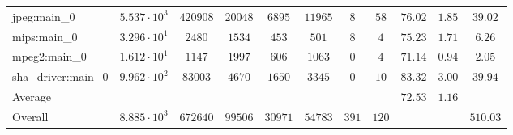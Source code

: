 \begin{tabular}{|l|c|c|c|c|c|c|c|c|c|c|}
jpeg:main\_0            & $ 5.537 \cdot 10^{3} $ & $ 420908 $ & $ 20048 $ & $ 6895  $ & $ 11965 $ & $ 8   $ & $ 58  $ & $ 76.02       $ & $ 1.85    $ & $ 39.02   $ \\
mips:main\_0            & $ 3.296 \cdot 10^{1} $ & $ 2480   $ & $ 1534  $ & $ 453   $ & $ 501   $ & $ 8   $ & $ 4   $ & $ 75.23       $ & $ 1.71    $ & $ 6.26    $ \\
mpeg2:main\_0           & $ 1.612 \cdot 10^{1} $ & $ 1147   $ & $ 1997  $ & $ 606   $ & $ 1063  $ & $ 0   $ & $ 4   $ & $ 71.14       $ & $ 0.94    $ & $ 2.05    $ \\
sha\_driver:main\_0     & $ 9.962 \cdot 10^{2} $ & $ 83003  $ & $ 4670  $ & $ 1650  $ & $ 3345  $ & $ 0   $ & $ 10  $ & $ 83.32       $ & $ 3.00    $ & $ 39.94   $ \\
\hline
Average                 & $                    $ & $        $ & $       $ & $       $ & $       $ & $     $ & $     $ & $ 72.53       $ & $ 1.16    $ & $         $ \\
\hline
Overall                 & $ 8.885 \cdot 10^{3} $ & $ 672640 $ & $ 99506 $ & $ 30971 $ & $ 54783 $ & $ 391 $ & $ 120 $ & $             $ & $         $ & $ 510.03  $ \\
\hline
\end{tabular}
